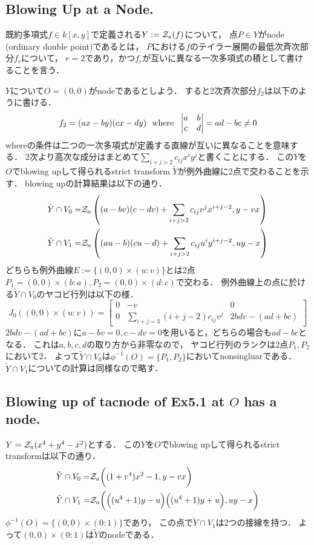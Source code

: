 \documentclass[a4paper]{jsarticle}
\begin{document}
    \subsection{Blowing Up at a Node.}
    既約多項式$f \in k[x,y]$で定義される$Y:=\mathcal{Z}_a(f)$について，
    点$P \in Y$がnode (ordinary double point)であるとは，
    $P$における$f$のテイラー展開の最低次斉次部分$f_r$について，
    $r=2$であり，かつ$f_r$が互いに異なる一次多項式の積として書けることを言う．

    $Y$について$O=(0,0)$がnodeであるとしよう．
    すると2次斉次部分$f_2$は以下のように書ける．
    \[
        f_2=(ax-by)(cx-dy)
        \text{~~where~~}
        \begin{vmatrix}
            a & b \\ c & d
        \end{vmatrix}
        =ad-bc
        \neq 0
    \]
    whereの条件は二つの一次多項式が定義する直線が互いに異なることを意味する．
    2次より高次な成分はまとめて$\sum_{i+j>2}{c_{ij} x^i y^j}$と書くことにする．
    この$Y$を$O$でblowing upして得られるstrict transform $\tilde{Y}$が例外曲線に2点で交わることを示す．
    blowing upの計算結果は以下の通り．
    \begin{align*}
        \tilde{Y} \cap V_0 =& \mathcal{Z}_a \left( (a-bv)(c-dv)+\sum_{i+j>2}{c_{ij} v^j x^{i+j-2}}, y-vx \right) \\
        \tilde{Y} \cap V_1 =& \mathcal{Z}_a \left( (au-b)(cu-d)+\sum_{i+j>2}{c_{ij} u^i y^{i+j-2}}, uy-x \right)
    \end{align*}
    どちらも例外曲線$E:=\{(0,0) \times (u:v) \}$とは2点$P_1=(0,0) \times (b:a), P_2=(0,0) \times (d:c)$で交わる．
    例外曲線上の点に於ける$\tilde{Y} \cap V_0$のヤコビ行列は以下の様．
    \[
        J_0((0,0) \times (u:v))=
        \begin{bmatrix}
            0 & -v & 0 \\
            0 & \sum_{i+j=3}{(i+j-2) c_{ij} v^j} & 2bdv-(ad+bc)
        \end{bmatrix}
    \]
    $2bdv-(ad+bc)$に$a-bv=0, c-dv=0$を用いると，どちらの場合も$ad-bc$となる．
    これは$a,b,c,d$の取り方から非零なので，
    ヤコビ行列のランクは2点$P_1, P_2$において2．
    よって$\tilde{Y} \cap V_0$は$\phi^{-1}(O)=\{P_1,P_2\}$においてnonsingluarである．
    $\tilde{Y} \cap V_1$についての計算は同様なので略す．

    \subsection{Blowing up of tacnode of Ex5.1 at $O$ has a node.}
    $Y=\mathcal{Z}_a(x^4+y^4-x^2)$とする．
    この$Y$を$O$でblowing upして得られるstrict transformは以下の通り．
    \begin{align*}
        \tilde{Y} \cap V_0 =& \mathcal{Z}_a \bigg( (1+v^4) x^2-1, y-vx \bigg) \\
        \tilde{Y} \cap V_1 =& \mathcal{Z}_a \bigg( \Big( (u^4+1) y-u \Big) \Big( (u^4+1) y+u \Big), uy-x \bigg)
    \end{align*}
    $\phi^{-1}(O)=\{(0,0) \times (0:1)\}$であり，
    この点で$\tilde{Y} \cap V_1$は2つの接線を持つ．
    よって$(0,0) \times (0:1)$は$\tilde{Y}$のnodeである．
\end{document}
